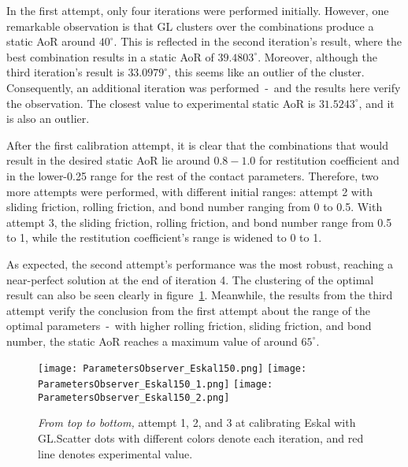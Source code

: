 In the first attempt, only four iterations were performed initially. However, one remarkable observation is that GL clusters over the combinations produce a static AoR around $40^{\circ}$. This is reflected in the second iteration's result, where the best combination results in a static AoR of $39.4803^{\circ}$. Moreover, although the third iteration's result is $33.0979^{\circ}$, this seems like an outlier of the cluster. Consequently, an additional iteration was performed~-~and the results here verify the observation. The closest value to experimental static AoR is $31.5243^{\circ}$, and it is also an outlier. 

After the first calibration attempt, it is clear that the combinations that would result in the desired static AoR lie around $0.8-1.0$ for restitution coefficient and in the lower-0.25 range for the rest of the contact parameters. Therefore, two more attempts were performed, with different initial ranges: attempt 2 with sliding friction, rolling friction, and bond number ranging from 0 to 0.5. With attempt 3, the sliding friction, rolling friction, and bond number range from 0.5 to 1, while the restitution coefficient's range is widened to 0 to 1. 

As expected, the second attempt's performance was the most robust, reaching a near-perfect solution at the end of iteration 4. The clustering of the optimal result can also be seen clearly in figure~\ref{fig:EskalGL}. Meanwhile, the results from the third attempt verify the conclusion from the first attempt about the range of the optimal parameters~-~with higher rolling friction, sliding friction, and bond number, the static AoR reaches a maximum value of around $65^{\circ}$.



\begin{figure}[H]
    \centering
    \texttt{[image: ParametersObserver\_Eskal150.png]}
    \texttt{[image: ParametersObserver\_Eskal150\_1.png]}
    \texttt{[image: ParametersObserver\_Eskal150\_2.png]}
    \caption{\textit{From top to bottom,} attempt 1, 2, and 3 at calibrating Eskal with GL.\@ Scatter dots with different colors denote each iteration, and red line denotes experimental value.}\label{fig:EskalGL}
\end{figure}




